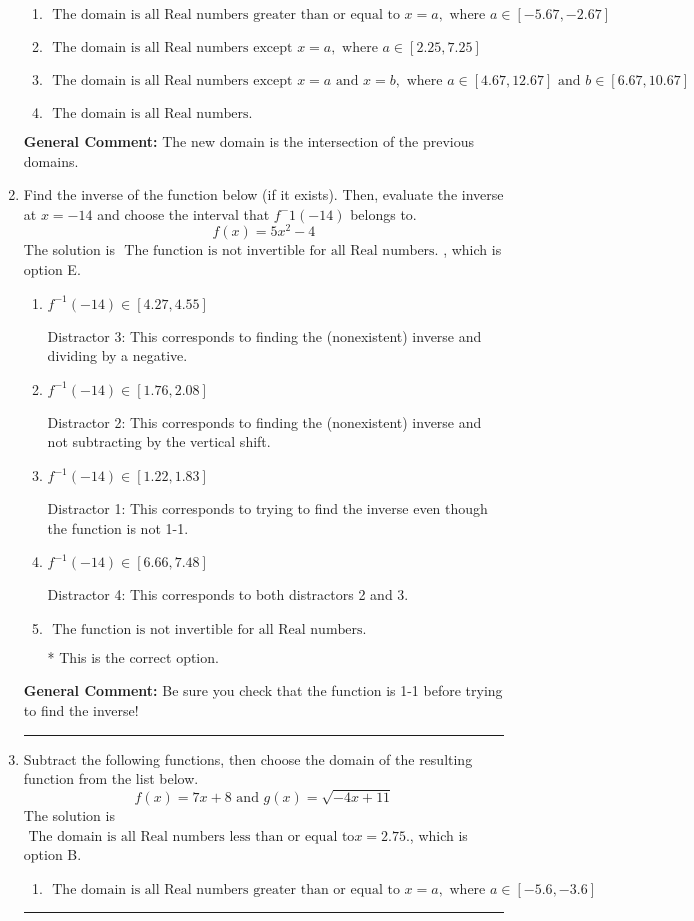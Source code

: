 \documentclass{extbook}[14pt]
\newcommand{\litem}[1]{\item #1

\rule{\textwidth}{0.4pt}}
\begin{document}
\begin{enumerate}
{\begin{enumerate}[label=\Alph*.]
\item \( \text{ The domain is all Real numbers greater than or equal to } x = a, \text{ where } a \in [-5.67, -2.67] \)


\item \( \text{ The domain is all Real numbers except } x = a, \text{ where } a \in [2.25, 7.25] \)


\item \( \text{ The domain is all Real numbers except } x = a \text{ and } x = b, \text{ where } a \in [4.67, 12.67] \text{ and } b \in [6.67, 10.67] \)


\item \( \text{ The domain is all Real numbers. } \)


\end{enumerate}

\textbf{General Comment:} The new domain is the intersection of the previous domains.
}
\litem{
Find the inverse of the function below (if it exists). Then, evaluate the inverse at $x = -14$ and choose the interval that $f^-1(-14)$ belongs to.
\[ f(x) = 5 x^2 - 4 \]The solution is \( \text{ The function is not invertible for all Real numbers. } \), which is option E.\begin{enumerate}[label=\Alph*.]
\item \( f^{-1}(-14) \in [4.27, 4.55] \)

 Distractor 3: This corresponds to finding the (nonexistent) inverse and dividing by a negative.
\item \( f^{-1}(-14) \in [1.76, 2.08] \)

 Distractor 2: This corresponds to finding the (nonexistent) inverse and not subtracting by the vertical shift.
\item \( f^{-1}(-14) \in [1.22, 1.83] \)

 Distractor 1: This corresponds to trying to find the inverse even though the function is not 1-1. 
\item \( f^{-1}(-14) \in [6.66, 7.48] \)

 Distractor 4: This corresponds to both distractors 2 and 3.
\item \( \text{ The function is not invertible for all Real numbers. } \)

* This is the correct option.
\end{enumerate}

\textbf{General Comment:} Be sure you check that the function is 1-1 before trying to find the inverse!
}
\litem{
Subtract the following functions, then choose the domain of the resulting function from the list below.
\[ f(x) = 7x + 8 \text{ and } g(x) = \sqrt{-4x+11}  \]The solution is \( \text{ The domain is all Real numbers less than or equal to} x = 2.75. \), which is option B.\begin{enumerate}[label=\Alph*.]
\item \( \text{ The domain is all Real numbers greater than or equal to } x = a, \text{ where } a \in [-5.6, -3.6] \)



\end{enumerate}}
\end{enumerate}
\end{document}
